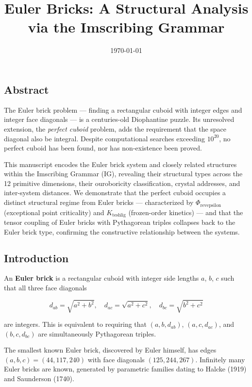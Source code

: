 \documentclass[10pt,a4paper]{article}
\begin{document}
\title{Euler Bricks: A Structural Analysis via the Imscribing Grammar}
\date{\today}

\maketitle

\subsection{Abstract}

The Euler brick problem --- finding a rectangular cuboid with integer edges and integer face diagonals --- is a centuries-old Diophantine puzzle. Its unresolved extension, the \emph{perfect cuboid} problem, adds the requirement that the space diagonal also be integral. Despite computational searches exceeding $10^{20}$, no perfect cuboid has been found, nor has non-existence been proved.

This manuscript encodes the Euler brick system and closely related structures within the Imscribing Grammar (IG), revealing their structural types across the 12 primitive dimensions, their ouroboricity classification, crystal addresses, and inter-system distances. We demonstrate that the perfect cuboid occupies a distinct structural regime from Euler bricks --- characterized by $\Phi_{\text{revepsilon}}$ (exceptional point criticality) and $K_{\text{teshlig}}$ (frozen-order kinetics) --- and that the tensor coupling of Euler bricks with Pythagorean triples collapses back to the Euler brick type, confirming the constructive relationship between the systems.

\subsection{Introduction}

An \textbf{Euler brick} is a rectangular cuboid with integer side lengths $a$, $b$, $c$ such that all three face diagonals

\[d_{ab} = \sqrt{a^2 + b^2}, \quad d_{ac} = \sqrt{a^2 + c^2}, \quad d_{bc} = \sqrt{b^2 + c^2}\]

are integers. This is equivalent to requiring that $(a,b,d_{ab})$, $(a,c,d_{ac})$, and $(b,c,d_{bc})$ are simultaneously Pythagorean triples.

The smallest known Euler brick, discovered by Euler himself, has edges $(a,b,c) = (44, 117, 240)$ with face diagonals $(125, 244, 267)$. Infinitely many Euler bricks are known, generated by parametric families dating to Halcke (1919) and Saunderson (1740).
\end{document}
